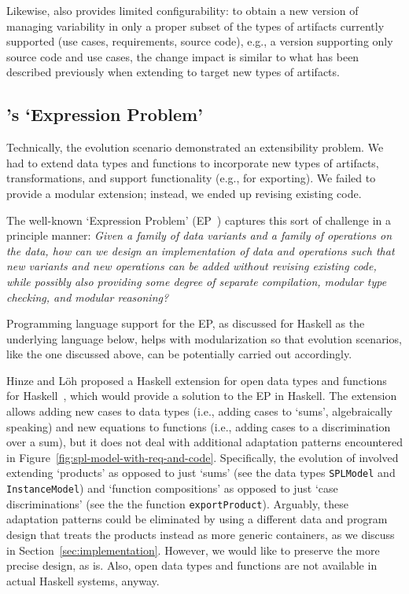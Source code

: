 Likewise, \hp{} also provides limited configurability: to obtain a new
version of \hp{} managing variability in only a proper subset of the
types of artifacts currently supported (use cases, requirements,
source code), e.g., a version supporting only source code and use
cases, the change impact is similar to what has been described
previously when extending \hp{} to target new types of artifacts.


\subsection{\hp's `Expression Problem'}
\label{sec:ep}

Technically, the evolution scenario demonstrated an extensibility
problem. We had to extend data types and functions to incorporate new
types of artifacts, transformations, and support functionality (e.g., for
exporting). We failed to provide a modular extension; instead, we
ended up revising existing code.

The well-known `Expression Problem'
(EP~\cite{Wadler98,Lopez-HerrejonBC05}) captures this sort of
challenge in a principle manner: \emph{Given a family of data variants
  and a family of operations on the data, how can we design an
  implementation of data and operations such that new variants and new
  operations can be added without revising existing code, while
  possibly also providing some degree of separate compilation, modular
  type checking, and modular reasoning?}

Programming language support for the EP, as discussed for Haskell as
the underlying language below, helps with modularization so that
evolution scenarios, like the one discussed above, can be potentially
carried out accordingly.

Hinze and L\"oh proposed a Haskell extension for open data types and
functions for Haskell~\cite{LoehH06}, which would provide a solution
to the EP in Haskell. The extension allows adding new cases to data
types (i.e., adding cases to `sums', algebraically speaking) and new
equations to functions (i.e., adding cases to a discrimination over a
sum), but it does not deal with additional adaptation patterns
encountered in
Figure~\ref{fig:spl-model-with-req-and-code}. Specifically, the
evolution of \hp{} involved extending `products' as opposed to just
`sums' (see the data types \texttt{SPLModel} and
\texttt{InstanceModel}) and `function compositions' as opposed to just
`case discriminations' (see the the function \texttt{exportProduct}).
Arguably, these adaptation patterns could be eliminated by using a
different data and program design that treats the products instead as
more generic containers, as we discuss in
Section~\ref{sec:implementation}. However, we would like to preserve
the more precise design, as is. Also, open data types and functions
are not available in actual Haskell systems, anyway.

